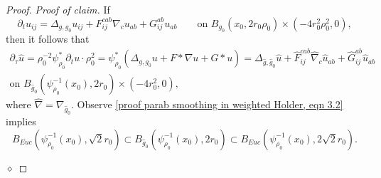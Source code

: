 \documentclass[12pt]{amsart}
\renewcommand{\1}{{\mathbf 1}}
\newenvironment{claimproof}{\par\noindent\textit{Proof of claim.}\space}{\hfill$\diamond$\medskip\par}
\theoremstyle{others}
\numberwithin{equation}{section}
\begin{document}
\begin{proof}
\begin{claimproof}
        If
        $$\partial_t u_{ij} = \Delta_{g, g_0} u_{ij} + F_{ij}^{cab} \nabla_c u_{ab} + G_{ij}^{ab} u_{ab} \qquad \text{on } B_{g_0}(x_0, 2 r_0 \rho_0 ) \times (-4r_0^2\rho_0^2, 0),$$
        then it follows that
        \begin{multline}
            \partial_\tau \hat u 
            = \rho_0^{-2} \psi_{\rho_0}^* \partial_t u \cdot \rho_0^2 
            = \psi_{\rho_0}^* \left( \Delta_{g, g_0} u + F * \nabla u + G* u  \right) 
            = \Delta_{\hat g, \hat g_0} \hat u + \hat F_{ij}^{cab} \hat \nabla_c\hat u_{ab} + \hat G_{ij}^{ab} \hat u_{ab} \\
            \text{on } B_{\hat g_0} (\psi_{\rho_0}^{-1}(x_0), 2r_0) \times (-4r_0^2, 0),
        \end{multline} 
        where $\hat \nabla = \nabla_{\hat g_0}$.
        Observe \eqref{proof parab smoothing in weighted Holder, eqn 3.2} implies
        \begin{equation} \label{proof parab smoothing in weighted Holder, eqn 3.4}
            B_{Euc}\left(\psi_{\rho_0}^{-1}(x_0), \sqrt 2 r_0 \right) \subset B_{\hat g_0} (\psi_{\rho_0}^{-1}(x_0), 2r_0)  \subset B_{Euc}\left(\psi_{\rho_0}^{-1}(x_0), 2\sqrt 2 r_0 \right) .  
        \end{equation}


\end{claimproof}
\end{proof}
\end{document}
